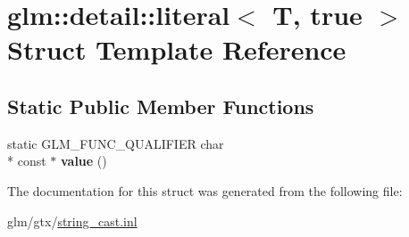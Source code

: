 \hypertarget{structglm_1_1detail_1_1literal_3_01T_00_01true_01_4}{\section{glm\-:\-:detail\-:\-:literal$<$ T, true $>$ Struct Template Reference}
\label{structglm_1_1detail_1_1literal_3_01T_00_01true_01_4}
}
\subsection*{Static Public Member Functions}
\begin{DoxyCompactItemize}
\item 
\hypertarget{structglm_1_1detail_1_1literal_3_01T_00_01true_01_4_ae18b91cfeeb373f6b7c62572f88cf239}{static G\-L\-M\-\_\-\-F\-U\-N\-C\-\_\-\-Q\-U\-A\-L\-I\-F\-I\-E\-R char \\*
const $\ast$ {\bfseries value} ()}\label{structglm_1_1detail_1_1literal_3_01T_00_01true_01_4_ae18b91cfeeb373f6b7c62572f88cf239}

\end{DoxyCompactItemize}


The documentation for this struct was generated from the following file\-:\begin{DoxyCompactItemize}
\item 
glm/gtx/\hyperlink{string__cast_8inl}{string\-\_\-cast.\-inl}\end{DoxyCompactItemize}
